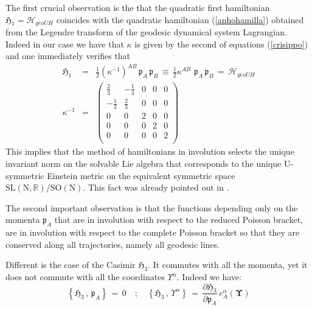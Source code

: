 \documentclass[10pt,a4paper]{article}
\newcommand{\ft}[2]{{\textstyle\frac{#1}{#2}}}
\begin{document}
The first crucial observation is the that the  quadratic first hamiltonian $\mathfrak{H}_1=\mathcal{H}_{geoUH}$ coincides with the
quadratic hamiltonian (\ref{anhohamilla}) obtained from the Legendre transform of the geodesic dynamical system Lagrangian. Indeed in our case we have that $\kappa$ is given by the second of equations (\ref{crisippo}) and one immediately verifies that
\begin{eqnarray}\label{verificone}
  \mathfrak{H}_1  &= &\ft 12 \left(\kappa^{-1}\right)^{AB} \, \mathfrak{p}_A \, \mathfrak{p}_B \, \equiv \, \ft 12 \kappa^{AB} \, \, \mathfrak{p}_A \, \mathfrak{p}_B \, = \, \mathcal{H}_{geoUH}\nonumber\\
  \kappa^{-1} & = & \left(
\begin{array}{ccccc}
 \frac{2}{3} & -\frac{1}{3} & 0 & 0 & 0 \\
 -\frac{1}{3} & \frac{2}{3} & 0 & 0 & 0 \\
 0 & 0 & 2 & 0 & 0 \\
 0 & 0 & 0 & 2 & 0 \\
 0 & 0 & 0 & 0 & 2 \\
\end{array}
\right)
\end{eqnarray}
This implies that the method of hamiltonians in involution selects the unique invariant norm on the solvable Lie algebra that corresponds to the unique $\mathrm{U}$-symmetric Einstein metric on the equivalent symmetric space $\mathrm{SL(N,\mathbb{R})/SO(N)}$. This fact was already pointed out in \cite{sashaebog}.
\par
The second important observation is that the functions depending only on the momenta $\mathfrak{p}_A$ that are in involution with respect to the reduced Poisson bracket, are in involution with respect to the complete Poisson bracket so that they are conserved along all trajectories, namely all geodesic lines.
\par
Different is the case of the Casimir $ \mathfrak{H}_3$. It commutes with all the momenta, yet it does not commute with all the coordinates $\Upsilon^\alpha$. Indeed we have:
\begin{equation}\label{rattus}
  \left\{\mathfrak{H}_3\, , \, \mathfrak{p}_A \right\} \, = \, 0 \quad ; \quad
  \left\{\mathfrak{H}_3\, , \, \Upsilon^\alpha \right\} \, = \,  \frac{\partial \mathfrak{H}_3}{\partial \mathfrak{p}_A} \, e_A^\alpha(\boldsymbol{\Upsilon})
\end{equation}
\end{document}

